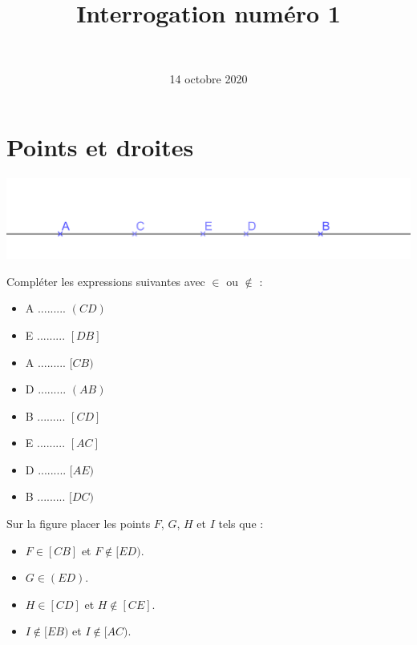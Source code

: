 \documentclass[a4paper,12pt]{exam}
\author{\ }
\date{14 octobre 2020}
\title{Interrogation numéro 1}
\begin{document}
%	

\maketitle
\section{Points et droites}

\begin{center}
	\includegraphics[scale=0.2]{img/droite}	
\end{center}

\begin{questions}
	\question Compléter les expressions suivantes avec $\in$ ou $\notin$ :
	
	\begin{multicols}{4}
		\begin{itemize}
			\item A ......... $(CD)$
			\item E ......... $[DB]$
			\item A ......... $[CB)$
			\item D ......... $(AB)$
			\item B ......... $[CD]$
			\item E ......... $[AC]$			
			\item D ......... $[AE)$
			\item B ......... $[DC)$
		\end{itemize}
	\end{multicols}

	\question Sur la figure placer les points $F$, $G$, $H$ et $I$ tels que :
	
	\begin{itemize}
		\item $F \in [CB] $ et $F \notin [ED)$.
		\item $G \in (ED)$.
		\item $H \in [CD] $ et $H \notin [CE]$.
		\item $I \notin [EB) $ et $I \notin [AC)$.
	\end{itemize}
\end{questions}
\end{document}
